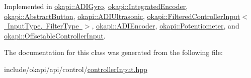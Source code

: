 Implemented in \mbox{\hyperlink{classokapi_1_1ADIGyro_ad6a8ed104c8383a64c984ceb1147bca4}{okapi\+::\+A\+D\+I\+Gyro}}, \mbox{\hyperlink{classokapi_1_1IntegratedEncoder_a5898ddc979b9cf2bcee0da3d440f28f8}{okapi\+::\+Integrated\+Encoder}}, \mbox{\hyperlink{classokapi_1_1AbstractButton_a4b8574ff797eb44fcd84d6831dc8a8a0}{okapi\+::\+Abstract\+Button}}, \mbox{\hyperlink{classokapi_1_1ADIUltrasonic_a1ba1e2c1b71dba82c762ba941fe811c0}{okapi\+::\+A\+D\+I\+Ultrasonic}}, \mbox{\hyperlink{classokapi_1_1FilteredControllerInput_abc48c2eb875b0e927d0fd6b462d391d6}{okapi\+::\+Filtered\+Controller\+Input$<$ Input\+Type, Filter\+Type $>$}}, \mbox{\hyperlink{classokapi_1_1ADIEncoder_a57358ad75caea8ddf829c40e9e42ab83}{okapi\+::\+A\+D\+I\+Encoder}}, \mbox{\hyperlink{classokapi_1_1Potentiometer_a8498720272d220e06ade0efbed634d3e}{okapi\+::\+Potentiometer}}, and \mbox{\hyperlink{classokapi_1_1OffsetableControllerInput_af51f93ac176113930ed07ee7b2b9b269}{okapi\+::\+Offsetable\+Controller\+Input}}.



The documentation for this class was generated from the following file\+:\begin{DoxyCompactItemize}
\item 
include/okapi/api/control/\mbox{\hyperlink{controllerInput_8hpp}{controller\+Input.\+hpp}}\end{DoxyCompactItemize}
